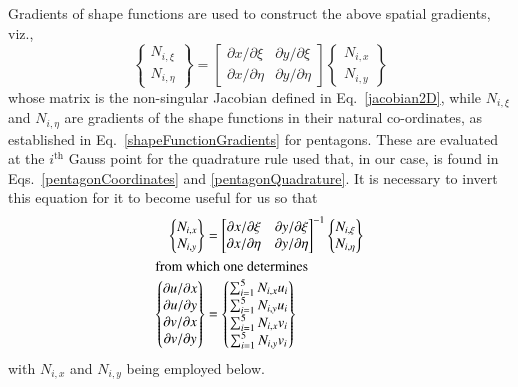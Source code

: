 Gradients of shape functions are used to construct the above spatial gradients, viz.,
\begin{displaymath}
    \begin{Bmatrix} 
    N_{i,\xi} \\ 
    N_{i,\eta}
    \end{Bmatrix} = \begin{bmatrix}
    \partial x / \partial \xi & \partial y / \partial \xi \\
    \partial x / \partial \eta & \partial y / \partial \eta
    \end{bmatrix} \begin{Bmatrix}
    N_{i,x} \\
    N_{i,y}
    \end{Bmatrix}
\end{displaymath}
whose matrix is the non-singular Jacobian defined in Eq.~\ref{jacobian2D}, while $N_{i,\xi}$ and $N_{i,\eta}$ are gradients of the shape functions in their natural co-ordinates, as established in Eq.~\ref{shapeFunctionGradients} for pentagons.  These are evaluated at the $i^{\text{th}}$ Gauss point for the quadrature rule used that, in our case, is found in Eqs.~\ref{pentagonCoordinates} and \ref{pentagonQuadrature}.  It is necessary to invert this equation for it to become useful for us so that
\begin{subequations}
    \label{pentagonGrads}
    \begin{align}
    \begin{Bmatrix} 
    N_{i,x} \\ 
    N_{i,y}
    \end{Bmatrix} & = \begin{bmatrix}
    \partial x / \partial \xi & \partial y / \partial \xi \\
    \partial x / \partial \eta & \partial y / \partial \eta
    \end{bmatrix}^{-1} \begin{Bmatrix}
    N_{i,\xi} \\
    N_{i,\eta}
    \end{Bmatrix} \\
    \intertext{from which one determines}
    \begin{Bmatrix}
    \partial u / \partial x \\
    \partial u / \partial y \\
    \partial v / \partial x \\
    \partial v / \partial y 
    \end{Bmatrix} & = \begin{Bmatrix}
    \sum\nolimits_{i=1}^5 N_{i,x} u_i \\
    \sum\nolimits_{i=1}^5 N_{i,y} u_i \\
    \sum\nolimits_{i=1}^5 N_{i,x} v_i \\
    \sum\nolimits_{i=1}^5 N_{i,y} v_i
    \end{Bmatrix}
    \end{align}
\end{subequations}
with $N_{i,x}$ and $N_{i,y}$ being employed below.

